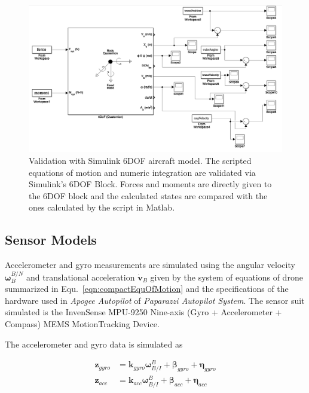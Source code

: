 \begin{figure}
\center
\includegraphics[width=1.1\columnwidth]{figures/validationViaSimulink}
\caption{Validation with Simulink 6DOF aircraft model. The scripted equations of motion and numeric integration are validated via Simulink's 6DOF Block. Forces and moments are directly given to the 6DOF block and the calculated states are compared with the ones calculated by the script in Matlab.}
\label{figure:validationSimulink}
\end{figure}

\subsection{Sensor Models}

Accelerometer and gyro measurements are simulated using the angular velocity $\bm{\omega}^{B/N}_B$ and translational acceleration $\dot{\bm{v}}_B$ given by the system of equations of drone summarized in Equ.~\ref{eqn:compactEquOfMotion} and the specifications of the hardware used in \emph{Apogee Autopilot} of \emph{Paparazzi Autopilot System}.
The sensor suit simulated is the InvenSense MPU-9250 Nine-axis (Gyro + Accelerometer + Compass) MEMS MotionTracking Device.
 
The accelerometer and gyro data is simulated as 
 
 \begin{align}
\bm{z}_{gyro} &= \bm{k}_{gyro} \bm{\omega}_{B/I}^B + \bm{\beta}_{gyro} + \bm{\eta}_{gyro}\\
\bm{z}_{acc} &= \bm{k}_{acc} \bm{\omega}_{B/I}^B + \bm{\beta}_{acc} + \bm{\eta}_{acc}
\end{align}

